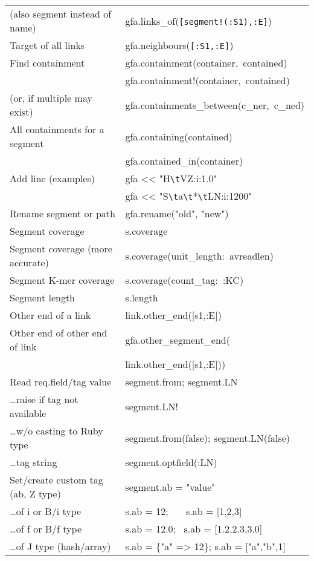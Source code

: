 \documentclass[12pt]{scrartcl}
\begin{document}
\begin{tabular}{|l|>{\ttfamily}l|}
  (also segment instead of name) &
  gfa.links\_of(\verb/[segment!(:S1),:E]/) \\
  Target of all links & gfa.neighbours(\verb/[:S1,:E]/) \\
  \hline
  Find containment  & gfa.containment(container,~contained)\\
                    & gfa.containment!(container,~contained)\\
  (or, if multiple may exist)  & gfa.containments\_between(c\_ner,~c\_ned)\\
  All containments for a segment & gfa.containing(contained)\\
                                 & gfa.contained\_in(container)\\
  \hline
  Add line (examples)        & gfa << "H\verb/\t/VZ:i:1.0" \\
                             & gfa << "S\verb/\t/a\verb/\t/*\verb/\t/LN:i:1200" \\
  Rename segment or path & gfa.rename("old", "new") \\
  \hline
  Segment coverage & s.coverage\\
  Segment coverage (more accurate) & s.coverage(unit\_length:~avreadlen)\\
  Segment K-mer coverage & s.coverage(count\_tag:~:KC)\\
  Segment length & s.length\\
  Other end of a link & link.other\_end([s1,:E])\\
  Other end of other end of link &
  gfa.other\_segment\_end(\\
  & \hspace{2.8cm}link.other\_end([s1,:E]))\\
  \hline
  Read req.field/tag value & segment.from; segment.LN \\
  \ldots raise if tag not available & segment.LN! \\
  \ldots w/o casting to Ruby type & segment.from(false); segment.LN(false)\\
  \ldots tag string & segment.optfield(:LN) \\
  \hline
  Set/create custom tag (ab, Z type) & segment.ab = "value" \\
  \ldots of i or B/i type & s.ab = 12; \ \ \ s.ab = [1,2,3]\\
  \ldots of f or B/f type & s.ab = 12.0; \ s.ab = [1.2,2.3,3.0] \\
  \ldots of J type (hash/array) & s.ab = \{"a" => 12\}; s.ab = ["a","b",1] \\
  \hline

\end{tabular}
\end{document}
